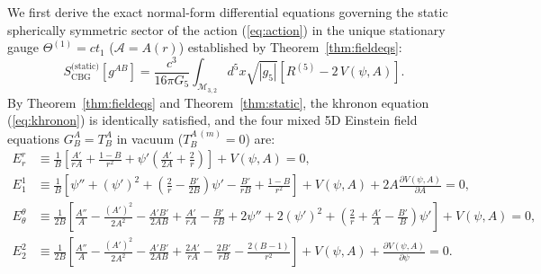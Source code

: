 \documentclass[11pt,a4paper]{article}
\theoremstyle{definition}
\theoremstyle{remark}
\begin{document}
We first derive the exact normal-form differential equations governing the static spherically symmetric sector of the action (\ref{eq:action}) in the unique stationary gauge $\Theta^{(1)} = c t_1$ ($\mathcal{A} = A(r)$) established by Theorem~\ref{thm:fieldeqs}:
\begin{equation}
  S_{\text{CBG}}^{\text{(static)}}\!\left[g^{AB}\right] = \frac{c^3}{16\pi G_5}\int_{\mathcal{M}_{3,2}} d^5x\sqrt{|g_5|}\left[R^{(5)} - 2\,V(\psi, A)\right].
  \label{eq:pure_geometric_5d_action}
\end{equation}
By Theorem~\ref{thm:fieldeqs} and Theorem~\ref{thm:static}, the khronon equation (\ref{eq:khronon}) is identically satisfied, and the four mixed 5D Einstein field equations $G^A_B = T^A_B$ in vacuum ($T^{A\,(m)}_B = 0$) are:
\begin{align}
  E^r_r &\equiv \frac{1}{B}\left[\frac{A'}{r A} + \frac{1 - B}{r^2} + \psi'\left(\frac{A'}{2A} + \frac{2}{r}\right)\right] + V(\psi,A) = 0, \label{eq:raw_Err} \\[4pt]
  E^1_1 &\equiv \frac{1}{B}\left[\psi'' + (\psi')^2 + \left(\frac{2}{r} - \frac{B'}{2B}\right)\psi' - \frac{B'}{r B} + \frac{1 - B}{r^2}\right] + V(\psi,A) + 2 A\frac{\partial V(\psi,A)}{\partial A} = 0, \label{eq:raw_E11} \\[4pt]
  E^{\theta}_{\theta} &\equiv \frac{1}{2 B}\left[\frac{A''}{A} - \frac{(A')^2}{2 A^2} - \frac{A' B'}{2 A B} + \frac{A'}{r A} - \frac{B'}{r B} + 2\psi'' + 2(\psi')^2 + \left(\frac{2}{r} + \frac{A'}{A} - \frac{B'}{B}\right)\psi'\right] + V(\psi,A) = 0, \label{eq:raw_Ethth} \\[4pt]
  E^2_2 &\equiv \frac{1}{2 B}\left[\frac{A''}{A} - \frac{(A')^2}{2 A^2} - \frac{A' B'}{2 A B} + \frac{2 A'}{r A} - \frac{2 B'}{r B} - \frac{2(B - 1)}{r^2}\right] + V(\psi,A) + \frac{\partial V(\psi,A)}{\partial\psi} = 0. \label{eq:raw_E22}
\end{align}
\end{document}
